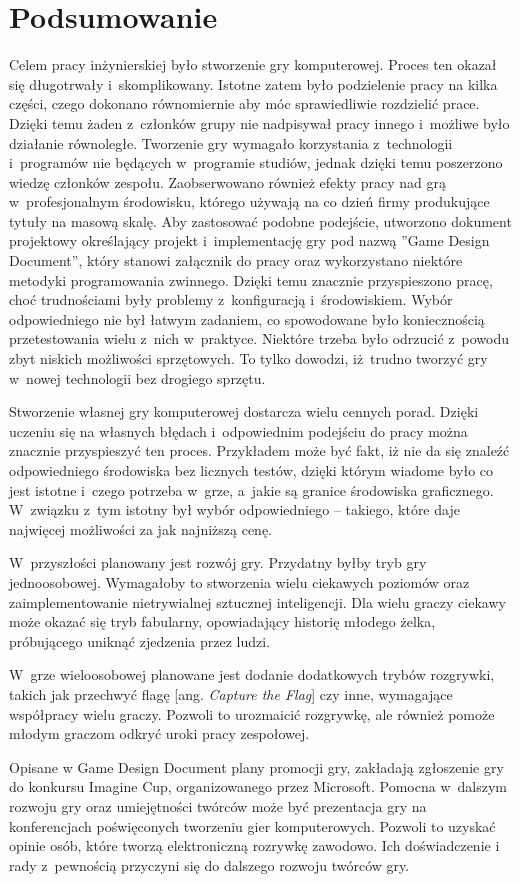 \chapter{Podsumowanie}

Celem pracy inżynierskiej było stworzenie gry komputerowej. Proces ten okazał się długotrwały i~skomplikowany. Istotne zatem było podzielenie pracy na kilka części, czego dokonano równomiernie aby móc sprawiedliwie rozdzielić prace. Dzięki temu żaden z~członków grupy nie nadpisywał pracy innego i~możliwe było działanie równoległe. Tworzenie gry wymagało korzystania z~technologii i~programów nie będących w~programie studiów, jednak dzięki temu poszerzono wiedzę członków zespołu. Zaobserwowano również efekty pracy nad grą w~profesjonalnym środowisku, którego używają na co dzień firmy produkujące tytuły na masową skalę. Aby zastosować podobne podejście, utworzono dokument projektowy określający projekt i~implementację gry pod nazwą ''Game Design Document'', który stanowi załącznik do pracy oraz wykorzystano niektóre metodyki programowania zwinnego. Dzięki temu znacznie przyspieszono pracę, choć trudnościami były problemy z~konfiguracją i~środowiskiem. Wybór odpowiedniego nie był łatwym zadaniem, co spowodowane było koniecznością przetestowania wielu z~nich w~praktyce. Niektóre trzeba było odrzucić z~powodu zbyt niskich możliwości sprzętowych. To tylko dowodzi, iż~trudno tworzyć gry w~nowej technologii bez drogiego sprzętu.

Stworzenie własnej gry komputerowej dostarcza wielu cennych porad. Dzięki uczeniu się na własnych błędach i~odpowiednim podejściu do pracy można znacznie przyspieszyć ten proces. Przykładem może być fakt, iż nie da się znaleźć odpowiedniego środowiska bez licznych testów, dzięki którym wiadome było co jest istotne i~czego potrzeba w~grze, a~jakie są granice środowiska graficznego. W~związku z~tym istotny był wybór odpowiedniego -- takiego, które daje najwięcej możliwości za jak najniższą cenę.

W~przyszłości planowany jest rozwój gry. Przydatny byłby tryb gry jednoosobowej. Wymagałoby to stworzenia wielu ciekawych poziomów oraz zaimplementowanie nietrywialnej sztucznej inteligencji.  Dla wielu graczy ciekawy może okazać się tryb fabularny, opowiadający historię młodego żelka, próbującego uniknąć zjedzenia przez ludzi.

W~grze wieloosobowej planowane jest dodanie dodatkowych trybów rozgrywki, takich jak przechwyć flagę [ang. \emph{Capture the Flag}] czy inne, wymagające współpracy wielu graczy. Pozwoli to urozmaicić rozgrywkę, ale również pomoże młodym graczom odkryć uroki pracy zespołowej.

Opisane w Game Design Document plany promocji gry, zakładają zgłoszenie gry do konkursu Imagine Cup, organizowanego przez Microsoft. Pomocna w~dalszym rozwoju gry oraz umiejętności twórców może być prezentacja gry na konferencjach poświęconych tworzeniu gier komputerowych. Pozwoli to uzyskać opinie osób, które tworzą elektroniczną rozrywkę zawodowo. Ich doświadczenie i rady z~pewnością przyczyni się do dalszego rozwoju twórców gry.